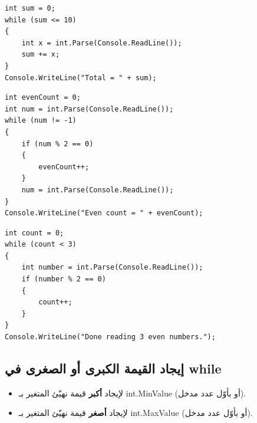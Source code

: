 \documentclass[14pt]{extarticle}
\begin{document}
\begin{boxExample}
\begin{english}
\begin{verbatim}
int sum = 0;
while (sum <= 10)
{
    int x = int.Parse(Console.ReadLine());
    sum += x;
}
Console.WriteLine("Total = " + sum);
\end{verbatim}
\end{english}
\end{boxExample}

\filbreak
\begin{boxExample}
\begin{english}
\begin{verbatim}
int evenCount = 0;
int num = int.Parse(Console.ReadLine());
while (num != -1)
{
    if (num % 2 == 0)
    {
        evenCount++;
    }
    num = int.Parse(Console.ReadLine());
}
Console.WriteLine("Even count = " + evenCount);
\end{verbatim}
\end{english}
\end{boxExample}

\filbreak
\begin{boxExample}
\begin{english}
\begin{verbatim}
int count = 0;
while (count < 3)
{
    int number = int.Parse(Console.ReadLine());
    if (number % 2 == 0)
    {
        count++;
    }
}
Console.WriteLine("Done reading 3 even numbers.");
\end{verbatim}
\end{english}
\end{boxExample}

\filbreak
\subsection{إيجاد القيمة الكبرى أو الصغرى في \textenglish{while}}
\begin{itemize}[nosep]
    \item لإيجاد \textbf{أكبر} قيمة نهيّئ المتغير بـ \textenglish{int.MinValue} (أو بأوّل عدد مدخل).
    \item لإيجاد \textbf{أصغر} قيمة نهيّئ المتغير بـ \textenglish{int.MaxValue} (أو بأوّل عدد مدخل).
\end{itemize}
\end{document}
